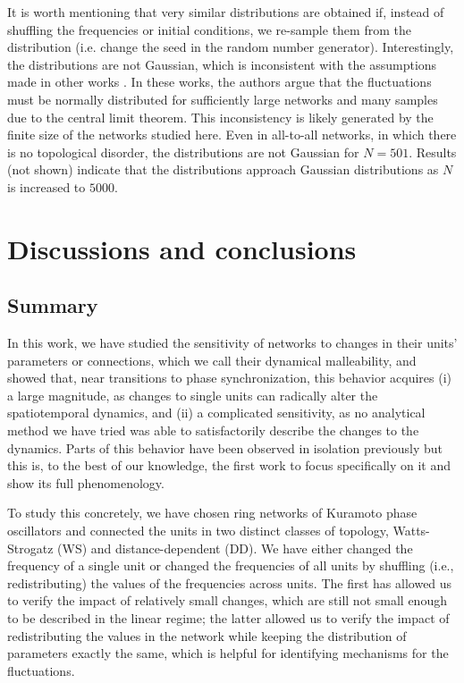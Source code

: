 It is worth mentioning that very similar distributions are obtained if, instead of shuffling the frequencies or initial conditions, we re-sample them from the distribution (i.e. change the seed in the random number generator).
Interestingly, the distributions are not Gaussian, which is inconsistent with the assumptions made in other works \cite{hong2007entrainment, hong2013link}. In these works, the authors argue that the fluctuations must be normally distributed for sufficiently large networks and many samples due to the central limit theorem. This inconsistency is likely generated by the finite size of the networks studied here. Even in all-to-all networks, in which there is no topological disorder, the distributions are not Gaussian for $N=501$. Results (not shown) indicate that the distributions approach Gaussian distributions as $N$ is increased to $5000$. 

\section{Discussions and conclusions}\label{sec:discussion_conclusion}
\subsection{Summary}
In this work, we have studied the sensitivity of networks to changes in their units' parameters or connections, which we call their dynamical malleability, and showed that, near transitions to phase synchronization, this behavior acquires (i) a large magnitude, as changes to single units can radically alter the spatiotemporal dynamics, and (ii) a complicated sensitivity, as no analytical method we have tried was able to satisfactorily describe the changes to the dynamics. Parts of this behavior have been observed in isolation previously \cite{budzinski2020synchronization, taylor2016synchronization, hong2002synchronization, peter2018transition, fernandez2022emergence, budzinski2019synchronous} but this is, to the best of our knowledge, the first work to focus specifically on it and show its full phenomenology. 

To study this concretely, we have chosen ring networks of Kuramoto phase oscillators and connected the units in two distinct classes of topology, Watts-Strogatz (WS) and distance-dependent (DD). We have either changed the frequency of a single unit or changed the frequencies of all units by shuffling (i.e., redistributing) the values of the frequencies across units. The first has allowed us to verify the impact of relatively small changes, which are still not small enough to be described in the linear regime; the latter allowed us to verify the impact of redistributing the values in the network while keeping the distribution of parameters exactly the same, which is helpful for identifying mechanisms for the fluctuations. 

